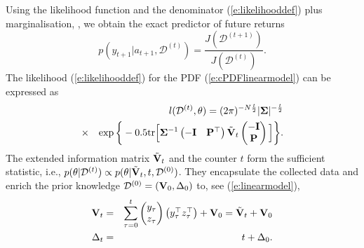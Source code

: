 Using the likelihood function and the denominator (\ref{e:likelihooddef}) plus marginalisation, \cite{Pet:81}, we obtain the exact predictor of future returns
\begin{equation}
    \label{e:returnsPDF}
    p(y_{t+1}| a_{t+1}, \mathcal{D}^{(t)}) = \frac{J(\mathcal{D}^{(t+1)})}{J(\mathcal{D}^{(t)})}.
\end{equation}
The likelihood (\ref{e:likelihooddef}) for the PDF (\ref{e:cPDFlinearmodel}) can be expressed as
\begin{eqnarray*}
    &&l(\mathcal{D}^{(t)}, \theta) = (2\pi)^{-N\frac{t}{2}} |\mathbf{\Sigma}|^{-\frac{t}{2}}\\
 \nonumber
  &\times&
   \exp\bigg\{-0.5\text{tr}\Big[\mathbf{\Sigma}^{-1}
   \begin{pmatrix}
    -\mathbf{I}&
    \mathbf{P}^{\top}
    \end{pmatrix}
    \tilde{\mathbf{V}}_{t}
    \begin{pmatrix}
    -\mathbf{I}\\
    \mathbf{P}
    \end{pmatrix}\Big]\bigg\}.
\end{eqnarray*}
The extended information matrix $\tilde{\mathbf{V}}_{t}$ and the counter $t$ form the sufficient statistic, i.e., $p(\theta|\mathcal{D}^{(t)})\propto p(\theta|\tilde{\mathbf{V}}_{t},t,\mathcal{D}^{(0)})$. They encapsulate the collected data and enrich the prior knowledge $\mathcal{D}^{(0)}=(\mathbf{V}_{0},\Delta_{0})$ to, see (\ref{e:linearmodel}),
\begin{eqnarray}
 \label{e:Vmatrix}
    \mathbf{V}_{t} &=& \sum_{\tau = 0}^{t}
    \begin{pmatrix}
        y_{\tau}\\ z_{\tau}
    \end{pmatrix}
    \begin{pmatrix}
        y_{\tau}^{\top} z_{\tau}^{\top}
    \end{pmatrix} + \mathbf{V}_{0} = \tilde{\mathbf{V}}_{t} + \mathbf{V}_{0}\\
  \nonumber      
     \Delta_{t}&=& t + \Delta_{0}.
\end{eqnarray}


